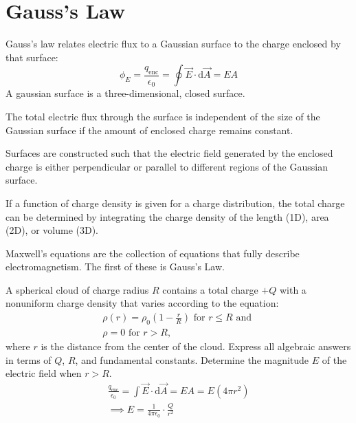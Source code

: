 \documentclass[../em.tex]{subfiles}
\begin{document}
\section{Gauss's Law}
Gauss's law relates electric flux to a Gaussian surface to the charge enclosed by that surface:
\[\phi_E=\frac{q_{\text{enc}}}{\epsilon_0}=\oint\vec{E}\cdot\mathrm{d}\vec{A}=EA\]
A gaussian surface is a three-dimensional, closed surface. 

The total electric flux through the surface is independent of the size of the Gaussian surface if the amount of enclosed charge remains constant.

Surfaces are constructed such that the electric field generated by the enclosed charge is either perpendicular or parallel to different regions of the Gaussian surface.

If a function of charge density is given for a charge distribution, the total charge can be determined by integrating the charge density of the length (1D), area (2D), or volume (3D).

Maxwell's equations are the collection of equations that fully describe electromagnetism. The first of these is Gauss's Law.
\begin{example}
    A spherical cloud of charge radius $R$ contains a total charge $+Q$ with a nonuniform charge density that varies according to the equation:
    \begin{align*}
        \rho(r)=\rho_0\left(1-\frac{r}{R}\right) \text{ for } r\leq R \text{ and }\\
        \rho = 0 \text{ for } r>R\text{,}
    \end{align*}
    where $r$ is the distance from the center of the cloud. Express all algebraic answers in terms of $Q$, $R$, and fundamental constants. Determine the magnitude $E$ of the electric field when $r>R$.
    \begin{align*}
        \frac{q_\text{enc}}{\epsilon_0}=\int\vec{E}\cdot\mathrm{d}\vec{A}=EA=E(4\pi r^2)
        \\
        \implies E=\frac{1}{4\pi\epsilon_0}\cdot\frac{Q}{r^2}
    \end{align*}
\end{example}
\end{document}
